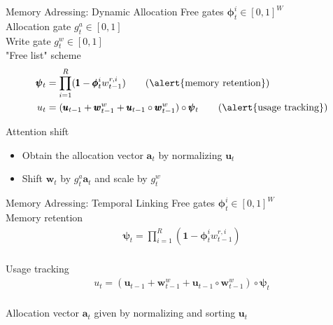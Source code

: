 \documentclass{beamer}
\begin{document}
\begin{frame}{Memory Adressing: Dynamic Allocation}
	\alert{Free gates} $\pmb{\phi}_t^i \in [0,1]^W$\\
	\alert{Allocation gate} $g_t^a \in [0,1]$\\
	\alert{Write gate} $g_t^w \in [0,1]$\\
	
	\alert{"Free list" scheme}
	\begin{align*}
	\pmb{\psi}_t &= \prod\limits_{i=1}^R (\pmb{1} - \pmb{\phi}_t^iw_{t-1}^{r,i}) \tag{\alert{memory retention}}\\
	u_t &= (\pmb{u}_{t-1} + \pmb{w}_{t-1}^w + \pmb{u}_{t-1} \circ \pmb{w}_{t-1}^w) \circ \pmb{\psi}_t \tag{\alert{usage tracking}}\\
	\end{align*}
	
	\pause
	\alert{Attention shift} 
	\begin{itemize}
	\item Obtain the \alert{allocation vector} $\pmb{a}_t$ by normalizing $\pmb{u}_t$\\
	\item \alert{Shift} $\pmb{w}_t$ by $g_t^a\pmb{a}_t$ and \alert{scale} by $g_t^w$
	\end{itemize}
\end{frame}

\begin{frame}{Memory Adressing: Temporal Linking}
	\alert{Free gates} $\pmb{\phi}_t^i \in [0,1]^W$\\
	
	\alert{Memory retention}
	\begin{align*}
	\pmb{\psi}_t = \prod\limits_{i=1}^R (\pmb{1} - \pmb{\phi}_t^iw_{t-1}^{r,i}) \\
	\end{align*}
	
	\pause
	\alert{Usage tracking}
	\begin{align*}
	u_t = (\pmb{u}_{t-1} + \pmb{w}_{t-1}^w + \pmb{u}_{t-1} \circ \pmb{w}_{t-1}^w) \circ \pmb{\psi}_t\\
	\end{align*}
	
	\pause
	\alert{Allocation vector} $\pmb{a}_t$ given by normalizing and sorting $\pmb{u}_t$
\end{frame}
\end{document}
